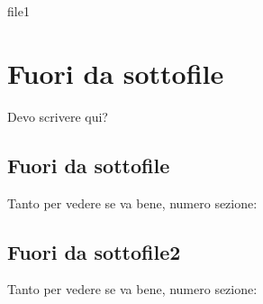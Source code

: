 \documentclass{miaclasse}
\begin{document}
\primapag

\pagestyle{fancy}





\renewcommand*\contentsname{Indice}
\tableofcontents




 


% 
{file1}

\chapter{Fuori da sottofile}
Devo scrivere qui?

\section{Fuori da sottofile}
Tanto per vedere se va bene, numero sezione: \thesection
\section{Fuori da sottofile2}
Tanto per vedere se va bene, numero sezione: \thesection
\end{document}
